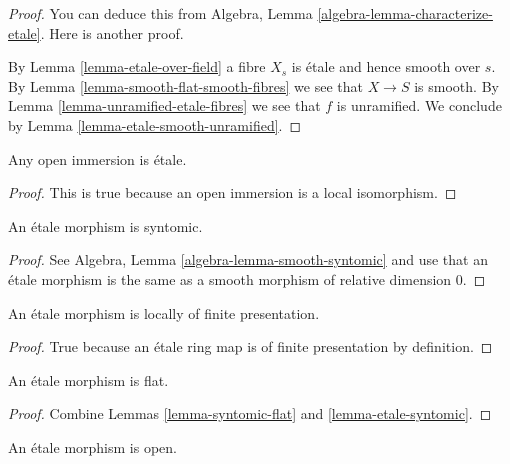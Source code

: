 \begin{proof}
You can deduce this from
Algebra, Lemma \ref{algebra-lemma-characterize-etale}.
Here is another proof.

\medskip\noindent
By Lemma \ref{lemma-etale-over-field} a fibre $X_s$ is \'etale
and hence smooth over $s$. By Lemma \ref{lemma-smooth-flat-smooth-fibres}
we see that $X \to S$ is smooth.
By Lemma \ref{lemma-unramified-etale-fibres}
we see that $f$ is unramified. We conclude by
Lemma \ref{lemma-etale-smooth-unramified}.
\end{proof}

\begin{lemma}
\label{lemma-open-immersion-etale}
Any open immersion is \'etale.
\end{lemma}

\begin{proof}
This is true because an open immersion is a local isomorphism.
\end{proof}

\begin{lemma}
\label{lemma-etale-syntomic}
An \'etale morphism is syntomic.
\end{lemma}

\begin{proof}
See Algebra, Lemma \ref{algebra-lemma-smooth-syntomic} and use that an
\'etale morphism is the same as a smooth morphism of relative dimension $0$.
\end{proof}

\begin{lemma}
\label{lemma-etale-locally-finite-presentation}
An \'etale morphism is locally of finite presentation.
\end{lemma}

\begin{proof}
True because an \'etale ring map is of finite presentation by
definition.
\end{proof}

\begin{lemma}
\label{lemma-etale-flat}
An \'etale morphism is flat.
\end{lemma}

\begin{proof}
Combine Lemmas \ref{lemma-syntomic-flat} and \ref{lemma-etale-syntomic}.
\end{proof}

\begin{lemma}
\label{lemma-etale-open}
An \'etale morphism is open.
\end{lemma}

